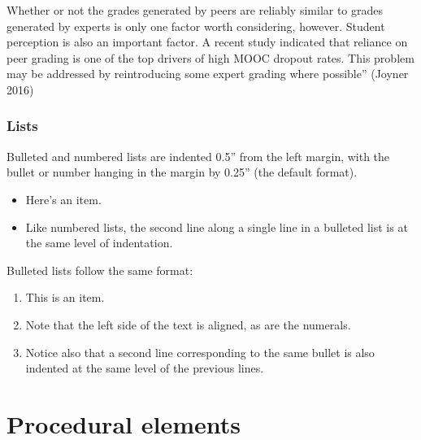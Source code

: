 \begin{quoting}
Whether or not the grades generated by peers are reliably similar to grades
generated by experts is only one factor worth considering, however. Student
perception is also an important factor. A recent study indicated that reliance
on peer grading is one of the top drivers of high MOOC dropout rates. This
problem may be addressed by reintroducing some expert grading where possible''
(Joyner 2016)
\end{quoting}

\subsubsection{Lists}
Bulleted and numbered lists are indented 0.5'' from the left margin, with the bullet or number hanging in the margin by 0.25'' (the default format).

\begin{itemize}
\item
  Here's an item.

\item
  Like numbered lists, the second line along a single line in a bulleted list is
  at the same level of indentation.
\end{itemize}

Bulleted lists follow the same format:
%
\begin{enumerate}
\item
  This is an item.
\item
  Note that the left side of the text is aligned, as are the numerals.
\item
  Notice also that a second line corresponding to the same bullet is also
  indented at the same level of the previous lines.
\end{enumerate}


\section{Procedural elements}

\notext

